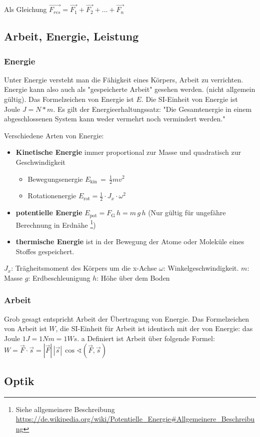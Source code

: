 \documentclass[../document.tex]{subfiles}
\begin{document}
Als Gleichung $\vec{F_{{res}}}=\vec  {F_{1}}+\vec  {F_{2}}+\dots+\vec  {F_{n}}$


\subsection{Arbeit, Energie, Leistung}
\subsubsection{Energie}

Unter Energie versteht man die Fähigkeit eines Körpers, Arbeit zu verrichten. Energie kann also auch als "gespeicherte Arbeit" gesehen werden. (nicht allgemein gültig). Das Formelzeichen von Energie ist $E$. Die SI-Einheit von Energie ist Joule $J = N * m$. Es gilt der Energieerhaltungssatz: "Die Gesamtenergie in einem abgeschlossenen System kann weder vermehrt noch vermindert werden."

Verschiedene Arten von Energie:
\begin{itemize}
 \item \textbf{Kinetische Energie} immer proportional zur Masse und quadratisch zur Geschwindigkeit
 \begin{itemize}
  \item Bewegungsenergie $E_{\mathrm {kin} }\,=\,{\frac {1}{2}}mv^{2}\,$
  \item Rotationenergie  $E_{\mathrm {rot} }={\frac {1}{2}}\cdot J_{x}\cdot \omega ^{2}$
 \end{itemize}
 \item \textbf{potentielle Energie} $E_{{\mathrm  {pot}}}=F_{{\mathrm  G}}\,h=m\,g\,h$ (Nur gültig für ungefähre Berechnung in Erdnähe \footnote{Siehe allgemeinere Beschreibung \url{https://de.wikipedia.org/wiki/Potentielle\_Energie\#Allgemeinere\_Beschreibung}})
 \item \textbf{thermische Energie} ist in der Bewegung der Atome oder Moleküle eines Stoffes gespeichert. 
\end{itemize}

$J_x$: Trägheitsmoment des Körpers um die x-Achse\newline
$\omega$: Winkelgeschwindigkeit.\newline
$m$: Masse\newline
$g$: Erdbeschleunigung\newline
$h$: Höhe über dem Boden

\subsubsection{Arbeit}
Grob gesagt entspricht Arbeit der Übertragung von Energie. Das Formelzeichen von Arbeit ist $W$, die SI-Einheit für Arbeit ist identisch mit der von Energie: das Joule $1 J = 1 Nm = 1 Ws$. 
\sphericalangle a
Definiert ist Arbeit über folgende Formel:
$W={\vec  F}\cdot {\vec  s}=|{\vec  F}|\,|{\vec  s}|\,\cos \sphericalangle \left({\vec  F},{\vec  s}\right)\,$


\subsection{Optik}
\end{document}

